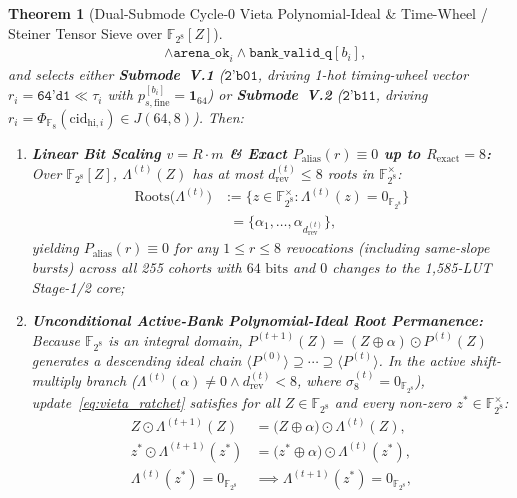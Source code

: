 \documentclass[11pt,letterpaper]{article}
\providecommand{\CoreClbLuts}{1,585}
\providecommand{\CorePhysicalLUTs}{\CoreClbLuts}
\theoremstyle{spectralthm}
\newtheorem{theorem}{Theorem}[section]
\begin{document}
\begin{theorem}[Dual-Submode Cycle-0 Vieta Polynomial-Ideal \& Time-Wheel / Steiner Tensor Sieve over {$\mathbb{F}_{2^8}[Z]$}]
\[\begin{aligned}
&\wedge \texttt{arena\_ok}_i \wedge \texttt{bank\_valid\_q}[b_i],
\end{aligned}
\]
and selects either \textbf{Submode~V.1} ($\texttt{2'b01}$, driving 1-hot timing-wheel vector $r_i = \texttt{64'd1} \ll \tau_i$ with $p_{s,\mathrm{fine}}^{[b_i]} = \mathbf{1}_{64}$) or \textbf{Submode~V.2} ($\texttt{2'b11}$, driving $r_i = \Phi_{\mathbb{F}_8}(\mathrm{cid}_{\mathrm{hi},i}) \in J(64,8)$). Then:
\begin{enumerate}
  \item[(i)] \textbf{Linear Bit Scaling $v = R \cdot m$ \& Exact $P_{\mathrm{alias}}(r) \equiv 0$ up to $R_{\mathrm{exact}} = 8$:} Over $\mathbb{F}_{2^8}[Z]$, $\Lambda^{(t)}(Z)$ has at most $d_{\mathrm{rev}}^{(t)} \le 8$ roots in $\mathbb{F}_{2^8}^\times$:
  \begin{equation}
  \label{eq:vieta_roots}
  \begin{aligned}
  \mathrm{Roots}\bigl(\Lambda^{(t)}\bigr)
  &:= \bigl\{z \in \mathbb{F}_{2^8}^\times : \Lambda^{(t)}(z) = 0_{\mathbb{F}_{2^8}}\bigr\}\\
  &\phantom{:}= \bigl\{\alpha_1, \ldots, \alpha_{d_{\mathrm{rev}}^{(t)}}\bigr\},
  \end{aligned}
  \end{equation}
  yielding $P_{\mathrm{alias}}(r) \equiv 0$ for any $1 \le r \le 8$ revocations (including same-slope bursts) across all 255 cohorts with $64\text{~bits}$ and $0$ changes to the \CorePhysicalLUTs-LUT Stage-1/2 core;
  \item[(ii)] \textbf{Unconditional Active-Bank Polynomial-Ideal Root Permanence:} Because $\mathbb{F}_{2^8}$ is an integral domain, $P^{(t+1)}(Z) = (Z \oplus \alpha) \odot P^{(t)}(Z)$ generates a descending ideal chain $\langle P^{(0)} \rangle \supseteq \cdots \supseteq \langle P^{(t)} \rangle$. In the active shift-multiply branch ($\Lambda^{(t)}(\alpha) \neq 0 \wedge d_{\mathrm{rev}}^{(t)} < 8$, where $\sigma_8^{(t)} = 0_{\mathbb{F}_{2^8}}$), update~\eqref{eq:vieta_ratchet} satisfies for all $Z \in \mathbb{F}_{2^8}$ and every non-zero $z^* \in \mathbb{F}_{2^8}^\times$:
  \begin{equation}
  \label{eq:vieta_monotone}
  \begin{aligned}
  Z \odot \Lambda^{(t+1)}(Z) &= \bigl(Z \oplus \alpha\bigr) \odot \Lambda^{(t)}(Z),\\
  z^* \odot \Lambda^{(t+1)}(z^*) &= \bigl(z^* \oplus \alpha\bigr) \odot \Lambda^{(t)}(z^*),\\
  \Lambda^{(t)}(z^*) = 0_{\mathbb{F}_{2^8}} &\implies \Lambda^{(t+1)}(z^*) = 0_{\mathbb{F}_{2^8}},

\end{aligned}
\end{equation}
\end{enumerate}
\end{theorem}
\end{document}
